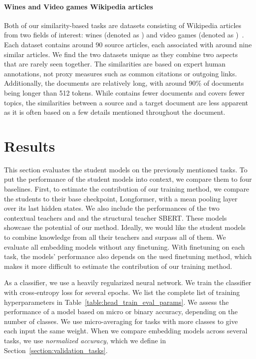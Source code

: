 \paragraph{Wines and Video games Wikipedia articles} Both of our
similarity-based tasks are datasets consisting of Wikipedia articles from two
fields of interest: wines (denoted as ) and video games (denoted
as )~\citep{ginzburg2021self}. Each dataset contains around 90
source articles, each associated with around nine similar articles. We find the two
datasets unique as they combine two aspects that are rarely seen together. The
similarities are based on expert human annotations, not proxy measures
such as common citations or outgoing links. Additionally, the documents are
relatively long, with around 90\% of documents being longer than 512 tokens.
While  contains fewer documents and covers fewer topics, the
similarities between a source and a target document are less apparent as it is
often based on a few details mentioned throughout the document.

\section{Results}\label{section:eval_results}

This section evaluates the student models on the previously mentioned tasks. To
put the performance of the student models into context, we compare them to four
baselines. First, to estimate the contribution of our training method, we
compare the students to their base checkpoint, Longformer, with a mean pooling
layer over its last hidden states. We also include the performances of the two
contextual teachers  and  and the structural teacher SBERT.
These models showcase the potential of our method. Ideally, we would like the
student models to combine knowledge from all their teachers and surpass all of
them. We evaluate all embedding models without any finetuning. With finetuning
on each task, the models' performance also depends on the used finetuning
method, which makes it more difficult to estimate the contribution of our
training method.

As a classifier, we use a heavily regularized neural network. We train the
classifier with cross-entropy loss for several epochs. We list the complete
list of training hyperparameters in Table~\ref{table:head_train_eval_params}.
We assess the performance of a model based on micro or binary accuracy,
depending on the number of classes. We use micro-averaging for tasks with more
classes to give each input the same weight. When we compare embedding models
across several tasks, we use \emph{normalized accuracy}, which we define in
Section~\ref{section:validation_tasks}.

